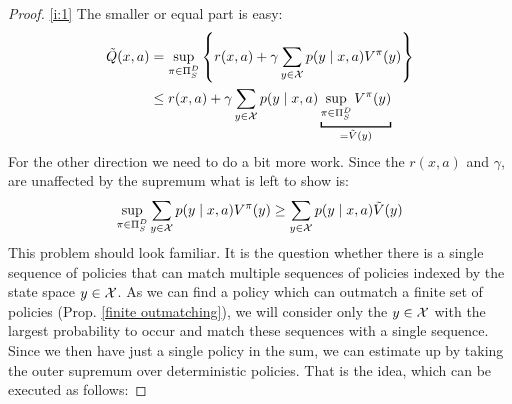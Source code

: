 \begin{proof} \ref{i:1} The smaller or equal part is easy:
	\begin{align*}
		\tilde{Q}(x,a)&= \sup_{\pi \in \detPolicy} \left\{r(x,a)
		+\gamma\sum_{y\in\cX}p(y\mid x,a) V^\pi(y)\right\}\\
		&\le r(x,a) +\gamma\sum_{y\in\cX}p(y\mid x,a) \underbracket[1pt]{\sup_{\pi \in \detPolicy}V^\pi(y)}_{=\tilde{V}(y)}
	\end{align*}
	For the other direction we need to do a bit more work. Since the \(r(x,a)\) and \(\gamma\), are unaffected by the supremum what is left to show is:
	\[
		\sup_{\pi \in \Pi_S^D}\sum_{y\in\mathcal{X}}p(y\mid x,a) V^\pi(y)
		\ge\sum_{y\in\mathcal{X}}p(y\mid x,a)\tilde{V}(y)
	\]
	This problem should look familiar. It is the question whether there is a single sequence of policies that can match multiple sequences of policies indexed by the state space \(y\in\mathcal{X}\).	As we can find a policy which can outmatch a finite set of policies (Prop. \ref{finite outmatching}), we will consider only the \(y\in\mathcal{X}\) with the largest probability to occur and match these sequences with a single sequence. Since we then have just a single policy in the sum, we can estimate up by taking the outer supremum over deterministic policies. That is the idea, which can be executed as follows:
	

\end{proof}
